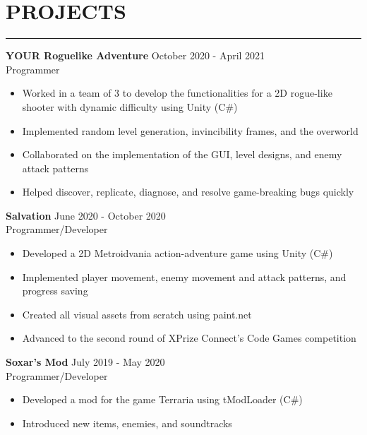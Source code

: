 \documentclass{article}
\begin{document}
\section*{PROJECTS} \vspace{-6pt} \hrule \vspace{6pt}
\textbf{YOUR Roguelike Adventure} \hfill October 2020 - April 2021\\
Programmer
\begin{itemize}
	\item\vspace{-6pt} Worked in a team of 3 to develop the functionalities for a 2D rogue-like shooter with dynamic difficulty using Unity (C$\#$)
	\item\vspace{-6pt} Implemented random level generation, invincibility frames, and the overworld
	\item\vspace{-6pt} Collaborated on the implementation of the GUI, level designs, and enemy attack patterns
	\item\vspace{-6pt} Helped discover, replicate, diagnose, and resolve game-breaking bugs quickly
\end{itemize}
\vspace{-6pt}
\textbf{Salvation} \hfill June 2020 - October 2020\\
Programmer/Developer
\begin{itemize}
	\item\vspace{-6pt} Developed a 2D Metroidvania action-adventure game using Unity (C$\#$)
	\item\vspace{-6pt} Implemented player movement, enemy movement and attack patterns, and progress saving
	\item\vspace{-6pt} Created all visual assets from scratch using paint.net
	\item\vspace{-6pt} Advanced to the second round of XPrize Connect's Code Games competition
\end{itemize}
\vspace{-6pt}
\textbf{Soxar's Mod} \hfill July 2019 - May 2020\\
Programmer/Developer
\begin{itemize}
	\item\vspace{-6pt} Developed a mod for the game Terraria using tModLoader (C$\#$)
	\item\vspace{-6pt} Introduced new items, enemies, and soundtracks
\end{itemize}
\vspace{-20pt}
\end{document}
